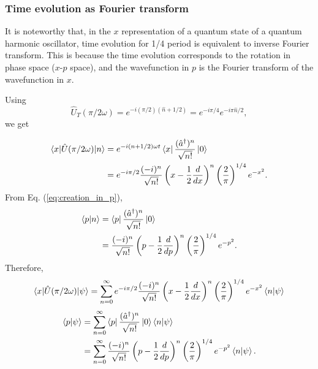 \documentclass{book}
\begin{document}
\subsubsection{Time evolution as Fourier transform}
It is noteworthy that, in the $x$ representation of a quantum state of a quantum harmonic oscillator, time evolution for 1/4 period is equivalent to inverse Fourier transform. This is because the time evolution corresponds to the rotation in phase space ($x$-$p$ space), and the wavefunction in $p$ is the Fourier transform of the wavefunction in $x$. 

Using
\begin{equation}
  \hat U_T(\pi/2\omega) = e^{-i(\pi/2)(\hat n + 1/2)} = e^{-i\pi/4}e^{-i\pi\hat n/2},
\end{equation}
we get

\begin{equation}
  \begin{aligned}
  	\braket{x|\hat U(\pi/2\omega)|n} &= e^{-i(n+1/2)\omega t}\bra x \frac{(\hat a^\dagger)^n}{\sqrt{n!}}\ket{0}\\
  	&= e^{-i\pi/2}\frac{(-i)^n}{\sqrt{n!}}\left(x - \frac 1 2 \frac{d}{dx} \right)^n\left(\frac 2 \pi \right)^{1/4}e^{-x^2}.\\
  \end{aligned}
\end{equation}
From Eq. (\ref{eq:creation_in_p}),
\begin{equation}
  \begin{aligned}
  	\braket{p|n} &= \bra p \frac{(\hat a^\dagger)^n}{\sqrt{n!}}\ket{0}\\
  	&= \frac{(-i)^n}{\sqrt{n!}}\left(p - \frac 1 2 \frac{d}{dp} \right)^n\left(\frac 2 \pi \right)^{1/4}e^{-p^2}.\\
  \end{aligned}
\end{equation}
Therefore,
\begin{equation}
  \begin{aligned}
  	\braket{x|\hat U(\pi/2\omega)|\psi} = \sum_{n=0}^\infty e^{-i\pi/2}\frac{(-i)^n}{\sqrt{n!}}\left(x - \frac 1 2 \frac{d}{dx} \right)^n\left(\frac 2 \pi \right)^{1/4}e^{-x^2}\braket{n|\psi}\\
  	\label{eq:time-evolved_wavefunction}
  \end{aligned}
\end{equation}
\begin{equation}
  \begin{aligned}
  	\braket{p|\psi} &= \sum_{n=0}^\infty \bra p \frac{(\hat a^\dagger)^n}{\sqrt{n!}}\ket{0}\braket{n|\psi}\\
  	&= \sum_{n=0}^\infty\frac{(-i)^n}{\sqrt{n!}}\left(p - \frac 1 2 \frac{d}{dp} \right)^n\left(\frac 2 \pi \right)^{1/4}e^{-p^2}\braket{n|\psi}.\\
  	\label{eq:time-evolved_wavefunction_p}
  \end{aligned}
\end{equation}
\end{document}
